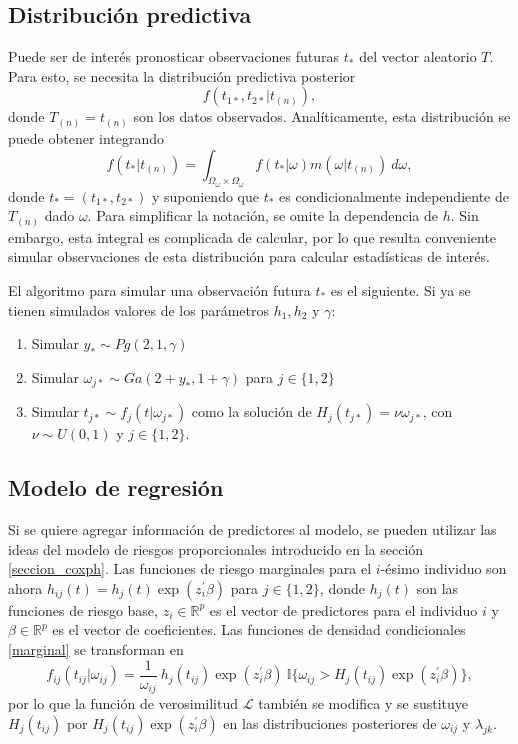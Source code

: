 \documentclass[11pt,a4paper]{article}
\begin{document}
\subsection{Distribución predictiva}
\label{sec:predict}
Puede ser de interés pronosticar observaciones futuras $t_*$ del vector aleatorio $T$. Para esto, se necesita la distribución predictiva posterior $$f(t_{1*}, t_{2*} | t_{(n)}),$$ donde $T_{(n)} = t_{(n)}$ son los datos observados. Analíticamente, esta distribución se puede obtener integrando $$f(t_* | t_{(n)}) = \int_{\Omega_\omega \times \Omega_\omega} f(t_* | \omega) m(\omega | t_{(n)}) \ d\omega,$$ donde $t_*=(t_{1*}, t_{2*})$ y suponiendo que $t_*$ es condicionalmente independiente de $T_{(n)}$ dado $\omega$. Para simplificar la notación, se omite la dependencia de $h$. Sin embargo, esta integral es complicada de calcular, por lo que resulta conveniente simular observaciones de esta distribución para calcular estadísticas de interés.

El algoritmo para simular una observación futura $t_*$ es el siguiente. Si ya se tienen simulados valores de los parámetros $h_1, h_2$ y $\gamma$:
\begin{enumerate}
\item Simular $y_* \sim Pg(2, 1, \gamma)$
\item Simular $\omega_{j*} \sim Ga(2 + y_*, 1 + \gamma)$ para $j\in \lbrace 1, 2 \rbrace$
\item Simular $t_{j*} \sim f_j(t|\omega_{j*})$ como la solución de $H_j(t_{j*}) = \nu \omega_{j*}$, con $\nu \sim U(0, 1)$ y $j\in \lbrace 1, 2 \rbrace$.
\end{enumerate}

\subsection{Modelo de regresión}

Si se quiere agregar información de predictores al modelo, se pueden utilizar las ideas del modelo de riesgos proporcionales introducido en la sección \ref{seccion_coxph}. Las funciones de riesgo marginales para el $i$-ésimo individuo son ahora $h_{ij}(t) = h_j(t)\exp (z_i^\prime \beta)$ para $j\in \lbrace 1, 2 \rbrace$, donde $h_j(t)$ son las funciones de riesgo base, $z_i \in \mathbb{R}^p$ es el vector de predictores para el individuo $i$ y $\beta\in \mathbb{R}^p$ es el vector de coeficientes. Las funciones de densidad condicionales \eqref{marginal} se transforman en
$$f_{ij}(t_{ij} | \omega_{ij}) = \frac{1}{\omega_{ij}} \ h_j(t_{ij})\exp (z_i^\prime \beta) \ \mathbb{I}\lbrace \omega_{ij} > H_j(t_{ij})\exp (z_i^\prime \beta) \rbrace,$$ por lo que la función de verosimilitud $\mathcal{L}$ también se modifica y se sustituye $H_j(t_{ij})$ por $H_j(t_{ij}) \exp (z_i^\prime \beta)$ en las distribuciones posteriores de $\omega_{ij}$ y $\lambda_{jk}$.
\end{document}
